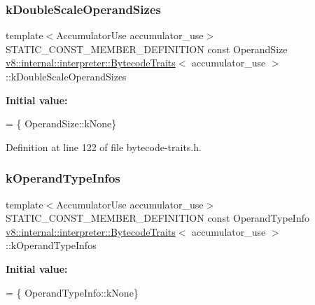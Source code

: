 \subsubsection{\texorpdfstring{k\+Double\+Scale\+Operand\+Sizes}{kDoubleScaleOperandSizes}}
{\footnotesize\ttfamily template$<$Accumulator\+Use accumulator\+\_\+use$>$ \\
S\+T\+A\+T\+I\+C\+\_\+\+C\+O\+N\+S\+T\+\_\+\+M\+E\+M\+B\+E\+R\+\_\+\+D\+E\+F\+I\+N\+I\+T\+I\+ON const Operand\+Size \mbox{\hyperlink{structv8_1_1internal_1_1interpreter_1_1BytecodeTraits}{v8\+::internal\+::interpreter\+::\+Bytecode\+Traits}}$<$ accumulator\+\_\+use $>$\+::k\+Double\+Scale\+Operand\+Sizes\hspace{0.3cm}{\ttfamily [static]}}

{\bfseries Initial value\+:}
\begin{DoxyCode}
= \{
        OperandSize::kNone\}
\end{DoxyCode}


Definition at line 122 of file bytecode-\/traits.\+h.

\mbox{\label{structv8_1_1internal_1_1interpreter_1_1BytecodeTraits_3_01accumulator__use_01_4_abf5e30cd0707e3a6256907bb0e4101e5}} 
\subsubsection{\texorpdfstring{k\+Operand\+Type\+Infos}{kOperandTypeInfos}}
{\footnotesize\ttfamily template$<$Accumulator\+Use accumulator\+\_\+use$>$ \\
S\+T\+A\+T\+I\+C\+\_\+\+C\+O\+N\+S\+T\+\_\+\+M\+E\+M\+B\+E\+R\+\_\+\+D\+E\+F\+I\+N\+I\+T\+I\+ON const Operand\+Type\+Info \mbox{\hyperlink{structv8_1_1internal_1_1interpreter_1_1BytecodeTraits}{v8\+::internal\+::interpreter\+::\+Bytecode\+Traits}}$<$ accumulator\+\_\+use $>$\+::k\+Operand\+Type\+Infos\hspace{0.3cm}{\ttfamily [static]}}

{\bfseries Initial value\+:}
\begin{DoxyCode}
= \{
        OperandTypeInfo::kNone\}
\end{DoxyCode}


